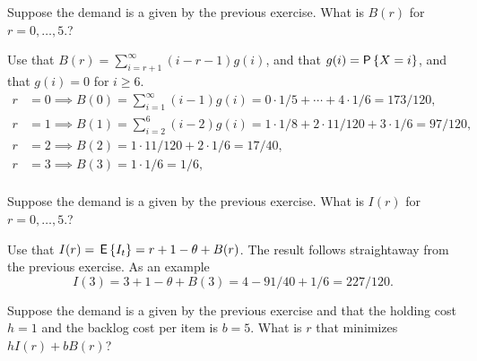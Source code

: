 \begin{question}\label{q:basestock_B}
Suppose the demand is a given by the previous exercise. What is $B(r)$ for $r=0,\ldots, 5$.?
\end{question}
\begin{solution}
  Use that $B(r) = \sum_{i=r+1}^\infty (i-r-1)g(i)$, and that $g(i) = \P{X = i}$, and that $g(i)=0$ for $i\geq 6$.
  \begin{align*}
    r&=0 \implies B(0) = \sum_{i=1}^\infty (i-1)g(i) =  0\cdot 1/5 + \cdots + 4 \cdot 1/6 = 173/120, \\
    r&=1 \implies B(1) = \sum_{i=2}^6 (i-2)g(i) =  1\cdot 1/8 + 2\cdot 11/120 + 3 \cdot 1/6 = 97/120, \\
    r&=2 \implies B(2) = 1\cdot 11/120 + 2 \cdot 1/6 = 17/40, \\
    r&=3 \implies B(3) = 1 \cdot 1/6 = 1/6, \\
  \end{align*}
\end{solution}

\begin{question}
Suppose the demand is a given by the previous exercise. What is $I(r)$ for $r=0,\ldots, 5$.?
\end{question}
\begin{solution}
  Use that $I(r) = \,\mathsf{E}\left\{I_t\right\} = r+1-\theta + B(r)$.  The result follows straightaway from the previous exercise. As an example
  \begin{equation*}
    I(3) = 3+1 - \theta + B(3) = 4 - 91/40 + 1/6 = 227/120.
  \end{equation*}
\end{solution}

\begin{question}
Suppose the demand is a given by the previous exercise and that the holding cost $h=1$ and the backlog cost per item is $b=5$.  What is $r$ that minimizes $hI(r)+bB(r)$?
\end{question}



